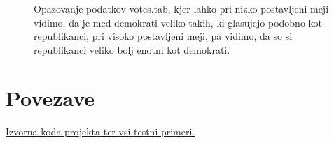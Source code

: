 \documentclass[a4paper]{article}
\begin{document}
	\begin{figure}[H]
	\begin{center}
	\end{center}
	\caption{Opazovanje podatkov votes.tab, kjer lahko pri nizko postavljeni meji vidimo, da je med demokrati veliko takih, ki glasujejo podobno kot republikanci, pri visoko postavljeni meji, pa vidimo, da so si republikanci veliko bolj enotni kot demokrati.}
	\label{f-votes}
	\end{figure}

\section{Povezave}
	\href{https://github.com/hamaxx/Universe-Classification}{Izvorna koda projekta ter vsi testni primeri.}
\end{document}
